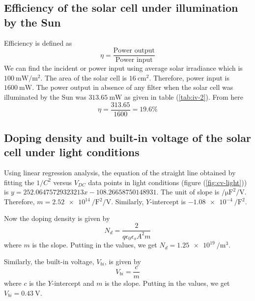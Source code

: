 \documentclass[%
 aip,
 amsmath,amssymb,
 reprint, floatfix%
]{revtex4-2}
\begin{document}
    \subsection{Efficiency of the solar cell under illumination by the Sun}
        Efficiency is defined as
        \begin{equation}
            \eta = \dfrac{\text{Power output}}{\text{Power input}}
        \end{equation}
        We can find the incident or power input using average solar irradiance which is $\SI{100}{\milli \watt \per \metre \squared}$. The area of the solar cell is $\SI{16}{\centi \metre \squared}$. Therefore, power input is $\SI{1600}{\milli \watt}$. The power output in absence of any filter when the solar cell was illuminated by the Sun was $\SI{313.65}{\milli \watt}$ as given in table (\ref{tab:iv-2}). From here
        \begin{equation}
            \boxed{\eta = \dfrac{313.65}{1600} = 19.6 \%}
        \end{equation}
    \subsection{Doping density and built-in voltage of the solar cell under light conditions}
        Using linear regression analysis, the equation of the straight line obtained by fitting the $1/C^2$ versus $V_{DC}$ data points in light conditions (figure (\ref{fig:cv-light})) is $y= 252.06475729323213x -108.26658750148931$. The unit of slope is $\si{\per \micro \farad \squared \per \volt}$. Therefore, $m = \SI{2.52e14}{\per \farad \squared \per \volt}$. Similarly, $Y$-intercept is $\SI{-1.08e-4}{\per \farad \squared}$.
        \par
        Now the doping density is given by
        \begin{equation}
            N_d = \dfrac{2}{q \epsilon_0 \epsilon_s A^2 m}
        \end{equation}
        where $m$ is the slope. Putting in the values, we get $N_d = \SI{1.25e19}{\per \metre \cubed}$.
        \par
        Similarly, the built-in voltage, $V_{bi}$, is given by
        \begin{equation}
            V_{bi} = \dfrac{c}{m}
        \end{equation}
        where $c$ is the $Y$-intercept and $m$ is the slope. Putting in the values, we get $V_{bi} = \SI{0.43}{\volt}$.
\end{document}
